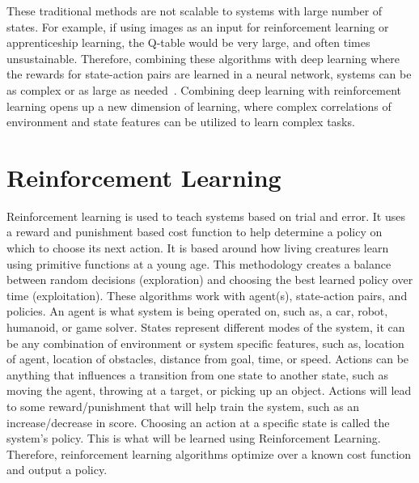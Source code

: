 \documentclass[12pt,american]{report}
\begin{document}
These traditional methods are not scalable to systems with large number of states.  For example, if using images as an input for reinforcement learning or apprenticeship learning, the Q-table would be very large, and often times unsustainable.  Therefore, combining these algorithms with deep learning where the rewards for state-action pairs are learned in a neural network, systems can be as complex or as large as needed~\cite{matiisen_2015}. Combining deep learning with reinforcement learning opens up a new dimension of learning, where complex correlations of environment and state features can be utilized to learn complex tasks.

\chapter{Reinforcement Learning}
Reinforcement learning is used to teach systems based on trial and error.  It uses a reward and punishment based cost function to help determine a policy on which to choose its next action.  It is based around how living creatures learn using primitive functions at a young age. This methodology creates a balance between random decisions (exploration) and choosing the best learned policy over time (exploitation). These algorithms work with agent(s), state-action pairs, and policies. An agent is what system is being operated on, such as, a car, robot, humanoid, or game solver. States represent different modes of the system, it can be any combination of environment or system specific features, such as, location of agent, location of obstacles, distance from goal, time, or speed. Actions can be anything that influences a transition from one state to another state, such as moving the agent, throwing at a target, or picking up an object.  Actions will lead to some reward/punishment that will help train the system, such as an increase/decrease in score.  Choosing an action at a specific state is called the system's policy. This is what will be learned using Reinforcement Learning.  Therefore, reinforcement learning algorithms optimize over a known cost function and output a policy.
\end{document}

